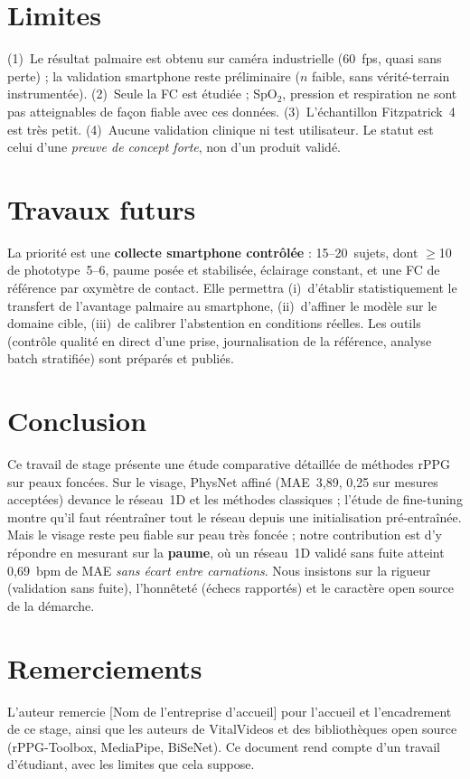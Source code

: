 \documentclass[11pt]{article}
\newcommand{\Entreprise}{[Nom de l'entreprise d'accueil]}
\begin{document}
\section{Limites}
\label{sec:limites}
(1)~Le résultat palmaire est obtenu sur caméra industrielle (60~fps, quasi sans
perte) ; la validation smartphone reste préliminaire ($n$ faible, sans vérité-terrain
instrumentée). (2)~Seule la FC est étudiée ; SpO$_2$, pression et respiration ne sont
pas atteignables de façon fiable avec ces données. (3)~L'échantillon Fitzpatrick~4 est
très petit. (4)~Aucune validation clinique ni test utilisateur. Le statut est celui
d'une \emph{preuve de concept forte}, non d'un produit validé.

\section{Travaux futurs}
\label{sec:futur}
La priorité est une \textbf{collecte smartphone contrôlée} : 15--20~sujets, dont
$\geq$10 de phototype~5--6, paume posée et stabilisée, éclairage constant, et une FC
de référence par oxymètre de contact. Elle permettra (i)~d'établir statistiquement le
transfert de l'avantage palmaire au smartphone, (ii)~d'affiner le modèle sur le
domaine cible, (iii)~de calibrer l'abstention en conditions réelles. Les outils
(contrôle qualité en direct d'une prise, journalisation de la référence, analyse
batch stratifiée) sont préparés et publiés.

\section{Conclusion}
\label{sec:conclusion}
Ce travail de stage présente une étude comparative détaillée de méthodes rPPG sur
peaux foncées. Sur le visage, PhysNet affiné (MAE~3{,}89, 0{,}25 sur mesures
acceptées) devance le réseau~1D et les méthodes classiques ; l'étude de fine-tuning
montre qu'il faut réentraîner tout le réseau depuis une initialisation
pré-entraînée. Mais le visage reste peu fiable sur peau très foncée ; notre
contribution est d'y répondre en mesurant sur la \textbf{paume}, où un réseau~1D
validé sans fuite atteint 0{,}69~bpm de MAE \emph{sans écart entre carnations}. Nous
insistons sur la rigueur (validation sans fuite), l'honnêteté (échecs rapportés) et
le caractère open source de la démarche.

\section*{Remerciements}
L'auteur remercie \Entreprise{} pour l'accueil et l'encadrement de ce stage, ainsi
que les auteurs de VitalVideos et des bibliothèques open source (rPPG-Toolbox,
MediaPipe, BiSeNet). Ce document rend compte d'un travail d'étudiant, avec les
limites que cela suppose.
\end{document}

